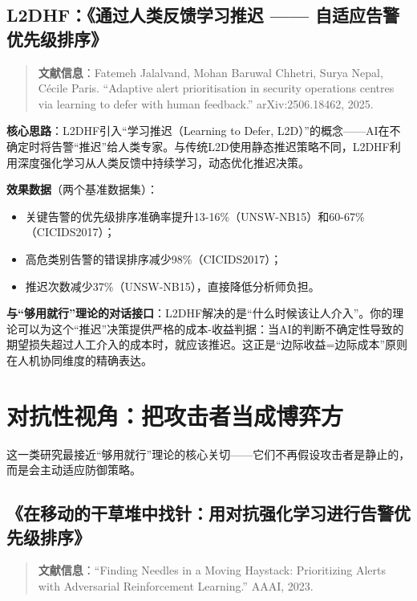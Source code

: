 \documentclass[11pt,a4paper]{article}
\begin{document}
\subsection{L2DHF：《通过人类反馈学习推迟 —— 自适应告警优先级排序》}

\begin{quote}
\textbf{文献信息}：Fatemeh Jalalvand, Mohan Baruwal Chhetri, Surya Nepal, Cécile Paris. “Adaptive alert prioritisation in security operations centres via learning to defer with human feedback.” arXiv:2506.18462, 2025.
\end{quote}

\textbf{核心思路}：L2DHF引入“学习推迟（Learning to Defer, L2D）”的概念——AI在不确定时将告警“推迟”给人类专家。与传统L2D使用静态推迟策略不同，L2DHF利用深度强化学习从人类反馈中持续学习，动态优化推迟决策。

\textbf{效果数据}（两个基准数据集）：
\begin{itemize}
    \item 关键告警的优先级排序准确率提升13-16\%（UNSW-NB15）和60-67\%（CICIDS2017）；
    \item 高危类别告警的错误排序减少98\%（CICIDS2017）；
    \item 推迟次数减少37\%（UNSW-NB15），直接降低分析师负担。
\end{itemize}

\textbf{与“够用就行”理论的对话接口}：L2DHF解决的是“什么时候该让人介入”。你的理论可以为这个“推迟”决策提供严格的成本-收益判据：当AI的判断不确定性导致的期望损失超过人工介入的成本时，就应该推迟。这正是“边际收益=边际成本”原则在人机协同维度的精确表达。

\section{对抗性视角：把攻击者当成博弈方}

这一类研究最接近“够用就行”理论的核心关切——它们不再假设攻击者是静止的，而是会主动适应防御策略。

\subsection{《在移动的干草堆中找针：用对抗强化学习进行告警优先级排序》}

\begin{quote}
\textbf{文献信息}：“Finding Needles in a Moving Haystack: Prioritizing Alerts with Adversarial Reinforcement Learning.” AAAI, 2023.
\end{quote}
\end{document}
